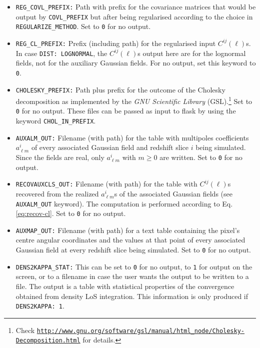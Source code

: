 \documentclass[12pt]{book} %
\begin{document}
\begin{itemize}
\item {\tt REG\_COVL\_PREFIX:} Path with prefix for the covariance matrices that would be output 
  by {\tt COVL\_PREFIX} but after being regularised according to the choice in {\tt REGULARIZE\_METHOD}.
  Set to {\tt 0} for no output.

\item {\tt REG\_CL\_PREFIX:} Prefix (including path) for the regularised input $C^{ij}(\ell)$s. 
  In case {\tt DIST: LOGNORMAL}, the $C^{ij}(\ell)$s output here are for the lognormal fields, not for 
  the auxiliary Gaussian fields. For no output, set this keyword to {\tt 0}.

\item {\tt CHOLESKY\_PREFIX:} Path plus prefix for the outcome of the Cholesky decomposition 
  as implemented by the \emph{GNU Scientific Library} 
  (GSL).\footnote{ Check {\tt \href{ http://www.gnu.org/software/gsl/manual/html\_node/Cholesky-Decomposition.html}{http://www.gnu.org/software/gsl/manual/html\_node/Cholesky-Decomposition.html}} for details.} Set to {\tt 0} for no output. 
  These files can be passed as input to {\sc flask} by using the keyword {\tt CHOL\_IN\_PREFIX}.
  
\item {\tt AUXALM\_OUT:} Filename (with path) for the table with multipoles coefficients 
  $a^{i}_{\ell m}$ of every associated Gaussian field and redshift slice $i$ being simulated. 
  Since the fields are real, only $a^{i}_{\ell m}$ with $m\geq 0$ are written.
  Set to {\tt 0} for no output.

\item {\tt RECOVAUXCLS\_OUT:} Filename (with path) for the table with $C^{ij}(\ell)$s recovered 
  from the realized $a^{i}_{\ell m}$s of the associated Gaussian fields (see {\tt AUXALM\_OUT} keyword). 
  The computation is performed according to Eq. \ref{eq:recov-cl}. Set to {\tt 0} for no output.

\item {\tt AUXMAP\_OUT:} Filename (with path) for a text table containing the pixel's centre angular 
  coordinates and the values at that point of every associated Gaussian field at every redshift slice 
  being simulated. Set to {\tt 0} for no output.

\item {\tt DENS2KAPPA\_STAT:} This can be set to {\tt 0} for no output, to {\tt 1} for output 
  on the screen, or to a filename in case the user wants the output to be written to a file. 
  The output is a table with statistical properties of the convergence obtained from density 
  LoS integration. This information is only produced if {\tt DENS2KAPPA: 1}.


\end{itemize}
\end{document}
